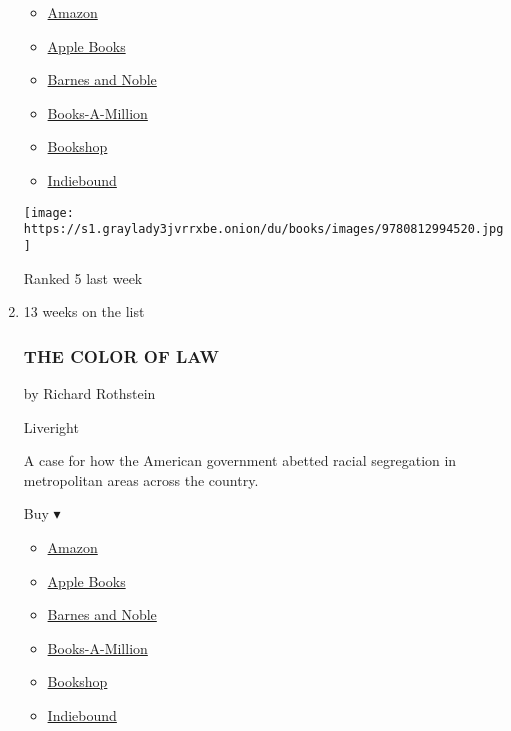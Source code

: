 \begin{enumerate}
  \begin{itemize}
  \tightlist
  \item
    \href{http://www.amazon.com/Just-Mercy-Story-Justice-Redemption-ebook/dp/B00JYWVYLY?tag=NYTBS-20}{Amazon}
  \item
    \href{https://du-gae-books-dot-nyt-du-prd.appspot.com/buy?title=JUST+MERCY\&author=Bryan+Stevenson}{Apple
    Books}
  \item
    \href{https://www.anrdoezrs.net/click-7990613-11819508?url=https\%3A\%2F\%2Fwww.barnesandnoble.com\%2Fw\%2F\%3Fean\%3D9780812984965}{Barnes
    and Noble}
  \item
    \href{https://www.anrdoezrs.net/click-7990613-35140?url=https\%3A\%2F\%2Fwww.booksamillion.com\%2Fp\%2FJUST\%2BMERCY\%2FBryan\%2BStevenson\%2F9780812984965}{Books-A-Million}
  \item
    \href{https://bookshop.org/a/3546/9780812984965}{Bookshop}
  \item
    \href{https://www.indiebound.org/book/9780812984965?aff=NYT}{Indiebound}
  \end{itemize}

  \texttt{[image: https://s1.graylady3jvrrxbe.onion/du/books/images/9780812994520.jpg]}

  Ranked 5 last week
\item
  13 weeks on the list

  \hypertarget{the-color-of-law}{%
  \subsubsection{THE COLOR OF LAW}\label{the-color-of-law}}

  by Richard Rothstein

  Liveright

  A case for how the American government abetted racial segregation in
  metropolitan areas across the country.

  Buy ▾

  \begin{itemize}
  \tightlist
  \item
    \href{https://www.amazon.com/Color-Law-Forgotten-Government-Segregated/dp/1631494538?tag=NYTBS-20}{Amazon}
  \item
    \href{https://du-gae-books-dot-nyt-du-prd.appspot.com/buy?title=THE+COLOR+OF+LAW\&author=Richard+Rothstein}{Apple
    Books}
  \item
    \href{https://www.anrdoezrs.net/click-7990613-11819508?url=https\%3A\%2F\%2Fwww.barnesandnoble.com\%2Fw\%2F\%3Fean\%3D9781631494536}{Barnes
    and Noble}
  \item
    \href{https://www.anrdoezrs.net/click-7990613-35140?url=https\%3A\%2F\%2Fwww.booksamillion.com\%2Fp\%2FTHE\%2BCOLOR\%2BOF\%2BLAW\%2FRichard\%2BRothstein\%2F9781631494536}{Books-A-Million}
  \item
    \href{https://bookshop.org/a/3546/9781631494536}{Bookshop}
  \item
    \href{https://www.indiebound.org/book/9781631494536?aff=NYT}{Indiebound}
  \end{itemize}


\end{enumerate}
